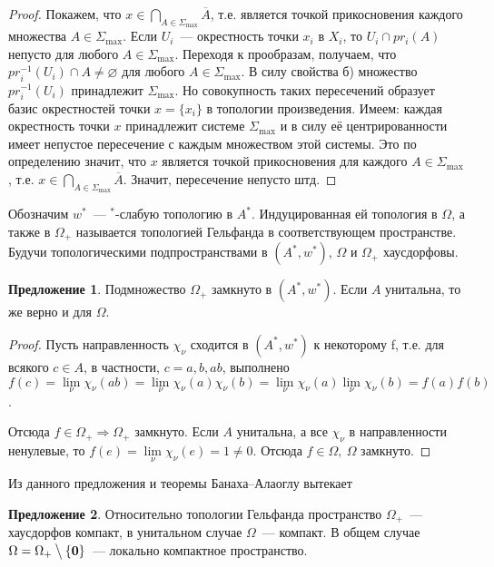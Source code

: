 \documentclass[12pt]{extarticle}
\renewcommand{\setminus}{\mathbin{\big\backslash}}%
\theoremstyle{definition}
\newtheorem{suggestion}{\indent Предложение}[section]
\begin{document}
\begin{proof}
    Покажем, что $x \in \bigcap \limits_{A \in \Sigma_{\max}} \overline{A}$, т.е. является точкой прикосновения каждого множества $A \in \Sigma_{\max}$. Если $U_i$~--- окрестность точки $x_i$ в $X_i$, то $U_i \cap pr_i(A)$ непусто для любого $A \in \Sigma_{\max}$. Переходя к прообразам, получаем, что $pr_i^{-1}(U_i) \cap A \neq \varnothing$ для любого $A \in \Sigma_{\max}$. В силу свойства б) множество $pr_i^{-1}(U_i)$ принадлежит $\Sigma_{\max}$. Но совокупность таких пересечений образует базис окрестностей точки $x = \{x_i\}$ в топологии произведения. Имеем: каждая окрестность точки $x$ принадлежит системе $\Sigma_{\max}$ и в силу её центрированности имеет непустое пересечение с каждым множеством этой системы. Это по определению значит, что $x$ является точкой прикосновения для каждого $A \in \Sigma_{\max}$, т.е. $x \in \bigcap \limits_{A \in \Sigma_{\max}} \overline{A}$. Значит, пересечение непусто штд.
    \end{proof}

    Обозначим $w^*$~--- $^*$-слабую топологию в $A^*$. Индуцированная ей топология в $\Omega$, а также в $\Omega_+$ называется топологией Гельфанда в соответствующем пространстве. Будучи топологическими подпространствами в $(A^*, w^*)$, $\Omega$ и $\Omega_+$ хаусдорфовы.

     \begin{suggestion}
    Подмножество $\Omega_+$ замкнуто в $(A^*, w^*)$. Если $A$ унитальна, то же верно и для $\Omega$.
    \end{suggestion}
    \begin{proof}
    Пусть направленность $\chi_{\nu}$ сходится в $(A^*, w^*)$ к некоторому f, т.е. для всякого $c \in A$, в частности, $c = a, b, ab$, выполнено $f(c) = \lim \limits_{\nu} \chi_{\nu}(ab) = \lim \limits_{\nu} \chi_{\nu}(a)\chi_{\nu}(b) = \lim \limits_{\nu} \chi_{\nu}(a) \lim \limits_{\nu} \chi_{\nu}(b) = f(a)f(b)$.

    Отсюда $f\in \Omega_+ \Rightarrow \Omega_+$ замкнуто. Если $A$ унитальна, а все $\chi_{\nu}$ в направленности ненулевые, то $f(e) = \lim \limits_{\nu} \chi_{\nu}(e) = 1 \neq 0$. Отсюда $f \in \Omega,\ \Omega$ замкнуто.
    \end{proof}

    Из данного предложения и теоремы Банаха--Алаоглу вытекает

    \begin{suggestion}
    Относительно топологии Гельфанда пространство $\Omega_+$~--- хаусдорфов компакт, в унитальном случае $\Omega$~--- компакт. В общем случае $\Omega = \Omega_+\setminus \{\mathbf{0}\}$~--- локально компактное пространство.
    \end{suggestion}
\end{document}
